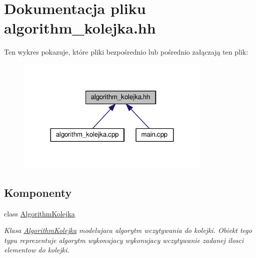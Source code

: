 \hypertarget{algorithm__kolejka_8hh}{\section{Dokumentacja pliku algorithm\-\_\-kolejka.\-hh}
\label{algorithm__kolejka_8hh}
}
Ten wykres pokazuje, które pliki bezpośrednio lub pośrednio załączają ten plik\-:\nopagebreak
\begin{figure}[H]
\begin{center}
\leavevmode
\includegraphics[width=264pt]{algorithm__kolejka_8hh__dep__incl}
\end{center}
\end{figure}
\subsection*{Komponenty}
\begin{DoxyCompactItemize}
\item 
class \hyperlink{class_algorithm_kolejka}{Algorithm\-Kolejka}
\begin{DoxyCompactList}\small\item\em Klasa \hyperlink{class_algorithm_kolejka}{Algorithm\-Kolejka} modelujaca algorytm wczytywania do kolejki. Obiekt tego typu reprezentuje algorytm wykonujacy wykonujacy wczytywanie zadanej ilosci elementow do kolejki. \end{DoxyCompactList}\end{DoxyCompactItemize}
